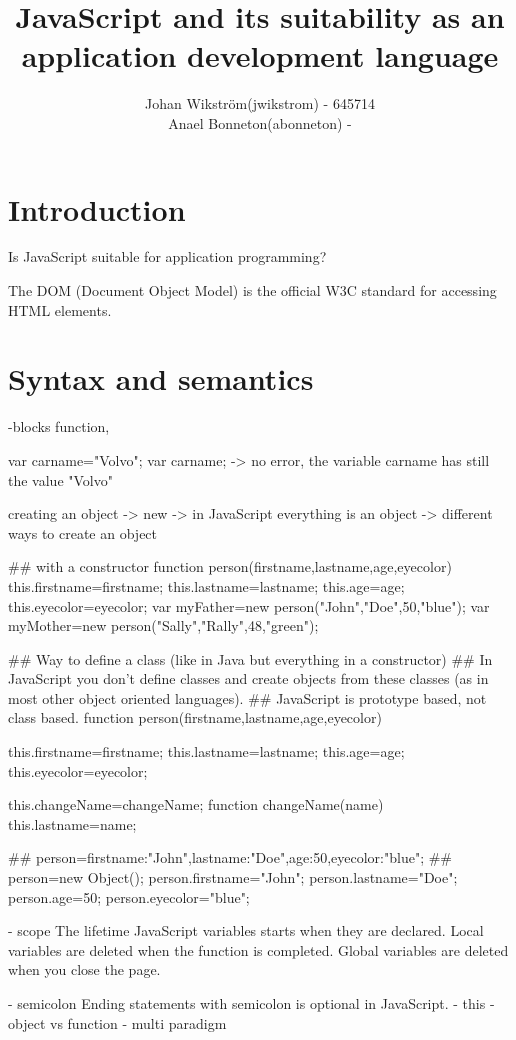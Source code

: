 \documentclass{report}
\title{JavaScript and its suitability as an application development language}
\author{Johan Wikström(jwikstrom) - 645714\\
Anael Bonneton(abonneton) - 
}
\begin{document}
\maketitle
\tableofcontents
\section{Introduction}
Is JavaScript suitable for application programming?


The DOM (Document Object Model) is the official W3C standard for accessing HTML elements. 

\section{Syntax and semantics}
    
        -blocks
            function, 

var carname="Volvo";
var carname;
    -> no error, the variable carname has still the value "Volvo"

creating an object -> new
    -> in JavaScript everything is an object
    -> different ways to create an object

    ## with a constructor
function person(firstname,lastname,age,eyecolor)
{
this.firstname=firstname;
this.lastname=lastname;
this.age=age;
this.eyecolor=eyecolor;
}
var myFather=new person("John","Doe",50,"blue");
var myMother=new person("Sally","Rally",48,"green");


## Way to define a class (like in Java but everything in a constructor)
## In JavaScript you don’t define classes and create objects from these classes (as in most other object oriented languages).
## JavaScript is prototype based, not class based.
function person(firstname,lastname,age,eyecolor)
{
this.firstname=firstname;
this.lastname=lastname;
this.age=age;
this.eyecolor=eyecolor;

this.changeName=changeName;
function changeName(name)
{
this.lastname=name;
}
}

    ## person={firstname:"John",lastname:"Doe",age:50,eyecolor:"blue"}; 
    ## 
person=new Object();
person.firstname="John";
person.lastname="Doe";
person.age=50;
person.eyecolor="blue"; 

	- scope
The lifetime JavaScript variables starts when they are declared.
Local variables are deleted when the function is completed.
Global variables are deleted when you close the page.


	- semicolon
Ending statements with semicolon is optional in JavaScript.
	- this
	- object vs function
	- multi paradigm
\end{document}
